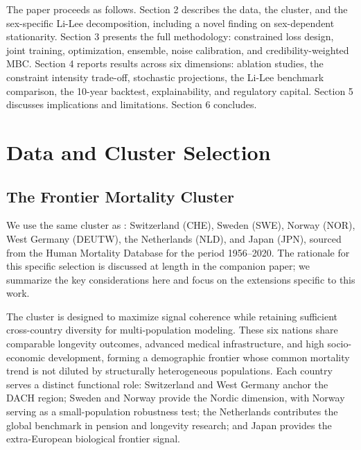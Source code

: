 \documentclass[11pt,a4paper]{article}
\begin{document}
The paper proceeds as follows. Section 2 describes the data, the cluster, and the sex-specific Li-Lee decomposition, including a novel finding on sex-dependent stationarity. Section 3 presents the full methodology: constrained loss design, joint training, optimization, ensemble, noise calibration, and credibility-weighted MBC. Section 4 reports results across six dimensions: ablation studies, the constraint intensity trade-off, stochastic projections, the Li-Lee benchmark comparison, the 10-year backtest, explainability, and regulatory capital. Section 5 discusses implications and limitations. Section 6 concludes.




\section{Data and Cluster Selection}

\subsection{The Frontier Mortality Cluster}

We use the same cluster as \cite{rindori2026p04}: Switzerland (CHE), Sweden (SWE), Norway (NOR), West Germany (DEUTW), the Netherlands (NLD), and Japan (JPN), sourced from the Human Mortality Database \cite{hmd2023} for the period 1956--2020. The rationale for this specific selection is discussed at length in the companion paper; we summarize the key considerations here and focus on the extensions specific to this work.

The cluster is designed to maximize signal coherence while retaining sufficient cross-country diversity for multi-population modeling. These six nations share comparable longevity outcomes, advanced medical infrastructure, and high socio-economic development, forming a demographic frontier whose common mortality trend is not diluted by structurally heterogeneous populations. Each country serves a distinct functional role: Switzerland and West Germany anchor the DACH region; Sweden and Norway provide the Nordic dimension, with Norway serving as a small-population robustness test; the Netherlands contributes the global benchmark in pension and longevity research; and Japan provides the extra-European biological frontier signal.
\end{document}
